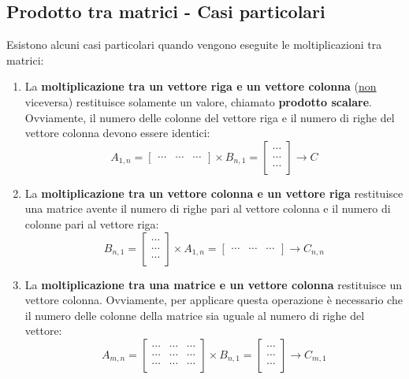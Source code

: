\documentclass[a4paper]{article}
\begin{document}
	\subsection{Prodotto tra matrici - Casi particolari}
	
	Esistono alcuni casi particolari quando vengono eseguite le moltiplicazioni tra matrici:
	\begin{enumerate}
		\item La \textbf{moltiplicazione tra un vettore riga e un vettore colonna} (\underline{non} viceversa) restituisce solamente un valore, chiamato \textbf{prodotto scalare}. Ovviamente, il numero delle colonne del vettore riga e il numero di righe del vettore colonna devono essere identici:
		\begin{equation*}
			A_{1,n} = \begin{bmatrix}
				\cdots & \cdots & \cdots
			\end{bmatrix} \times
			B_{n,1} = \begin{bmatrix}
				\cdots \\
				\cdots \\
				\cdots
			\end{bmatrix} \rightarrow
			C
		\end{equation*}
	
		\item La \textbf{moltiplicazione tra un vettore colonna e un vettore riga} restituisce una matrice avente il numero di righe pari al vettore colonna e il numero di colonne pari al vettore riga:
		\begin{equation*}
			B_{n,1} = \begin{bmatrix}
				\cdots \\
				\cdots \\
				\cdots
			\end{bmatrix} \times
			A_{1,n} = \begin{bmatrix}
				\cdots & \cdots & \cdots
			\end{bmatrix} \rightarrow
			C_{n, n}
		\end{equation*}
	
		\item La \textbf{moltiplicazione tra una matrice e un vettore colonna} restituisce un vettore colonna. Ovviamente, per applicare questa operazione è necessario che il numero delle colonne della matrice sia uguale al numero di righe del vettore:
		\begin{equation*}
			A_{m,n} = \begin{bmatrix}
				\cdots & \cdots & \cdots \\
				\cdots & \cdots & \cdots \\
				\cdots & \cdots & \cdots
			\end{bmatrix} \times
			B_{n, 1} = \begin{bmatrix}
				\cdots \\
				\cdots \\
				\cdots
			\end{bmatrix} \rightarrow
			C_{m, 1}
		\end{equation*}
	\end{enumerate}\newpage
\end{document}
